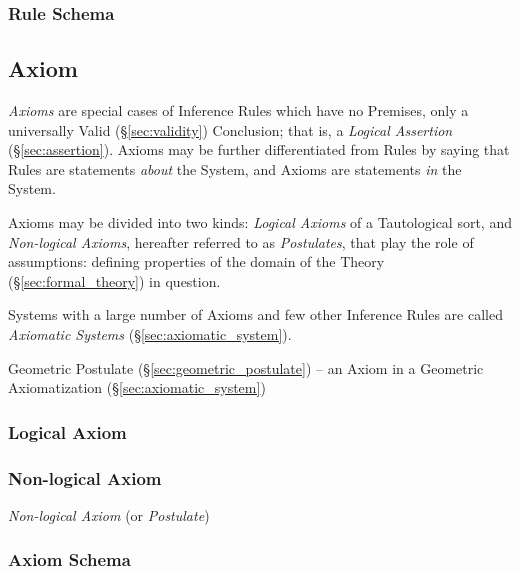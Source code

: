 \subsubsection{Rule Schema}\label{sec:rule_schema}



\subsection{Axiom}\label{sec:axiom}

\emph{Axioms} are special cases of Inference Rules which have no
Premises, only a universally Valid (\S\ref{sec:validity}) Conclusion;
that is, a \emph{Logical Assertion} (\S\ref{sec:assertion}). Axioms
may be further differentiated from Rules by saying that Rules are
statements \emph{about} the System, and Axioms are statements
\emph{in} the System.

Axioms may be divided into two kinds: \emph{Logical Axioms} of a
Tautological sort, and \emph{Non-logical Axioms}, hereafter referred
to as \emph{Postulates}, that play the role of assumptions: defining
properties of the domain of the Theory (\S\ref{sec:formal_theory}) in
question.

Systems with a large number of Axioms and few other Inference Rules
are called \emph{Axiomatic Systems} (\S\ref{sec:axiomatic_system}).

\fist Geometric Postulate (\S\ref{sec:geometric_postulate}) -- an Axiom in a
Geometric Axiomatization (\S\ref{sec:axiomatic_system})



\subsubsection{Logical Axiom}\label{sec:logical_axiom}

\subsubsection{Non-logical Axiom}\label{sec:nonlogical_axiom}

\emph{Non-logical Axiom} (or \emph{Postulate})



\subsubsection{Axiom Schema}\label{sec:axiom_schema}

